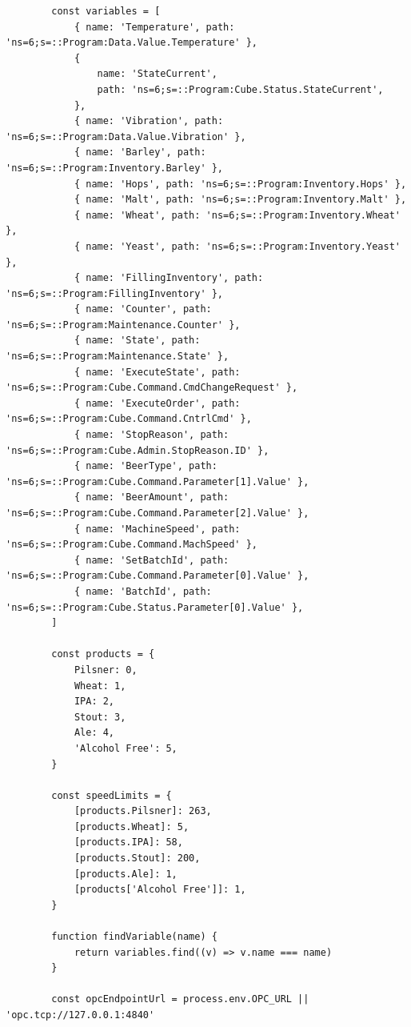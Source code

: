 \begin{center}
\begin{verbatim}
        const variables = [
            { name: 'Temperature', path: 'ns=6;s=::Program:Data.Value.Temperature' },
            {
                name: 'StateCurrent',
                path: 'ns=6;s=::Program:Cube.Status.StateCurrent',
            },
            { name: 'Vibration', path: 'ns=6;s=::Program:Data.Value.Vibration' },
            { name: 'Barley', path: 'ns=6;s=::Program:Inventory.Barley' },
            { name: 'Hops', path: 'ns=6;s=::Program:Inventory.Hops' },
            { name: 'Malt', path: 'ns=6;s=::Program:Inventory.Malt' },
            { name: 'Wheat', path: 'ns=6;s=::Program:Inventory.Wheat' },
            { name: 'Yeast', path: 'ns=6;s=::Program:Inventory.Yeast' },
            { name: 'FillingInventory', path: 'ns=6;s=::Program:FillingInventory' },
            { name: 'Counter', path: 'ns=6;s=::Program:Maintenance.Counter' },
            { name: 'State', path: 'ns=6;s=::Program:Maintenance.State' },
            { name: 'ExecuteState', path: 'ns=6;s=::Program:Cube.Command.CmdChangeRequest' },
            { name: 'ExecuteOrder', path: 'ns=6;s=::Program:Cube.Command.CntrlCmd' },
            { name: 'StopReason', path: 'ns=6;s=::Program:Cube.Admin.StopReason.ID' },
            { name: 'BeerType', path: 'ns=6;s=::Program:Cube.Command.Parameter[1].Value' },
            { name: 'BeerAmount', path: 'ns=6;s=::Program:Cube.Command.Parameter[2].Value' },
            { name: 'MachineSpeed', path: 'ns=6;s=::Program:Cube.Command.MachSpeed' },
            { name: 'SetBatchId', path: 'ns=6;s=::Program:Cube.Command.Parameter[0].Value' },
            { name: 'BatchId', path: 'ns=6;s=::Program:Cube.Status.Parameter[0].Value' },
        ]

        const products = {
            Pilsner: 0,
            Wheat: 1,
            IPA: 2,
            Stout: 3,
            Ale: 4,
            'Alcohol Free': 5,
        }

        const speedLimits = {
            [products.Pilsner]: 263,
            [products.Wheat]: 5,
            [products.IPA]: 58,
            [products.Stout]: 200,
            [products.Ale]: 1,
            [products['Alcohol Free']]: 1,
        }

        function findVariable(name) {
            return variables.find((v) => v.name === name)
        }

        const opcEndpointUrl = process.env.OPC_URL || 'opc.tcp://127.0.0.1:4840'


\end{verbatim}
\end{center}
